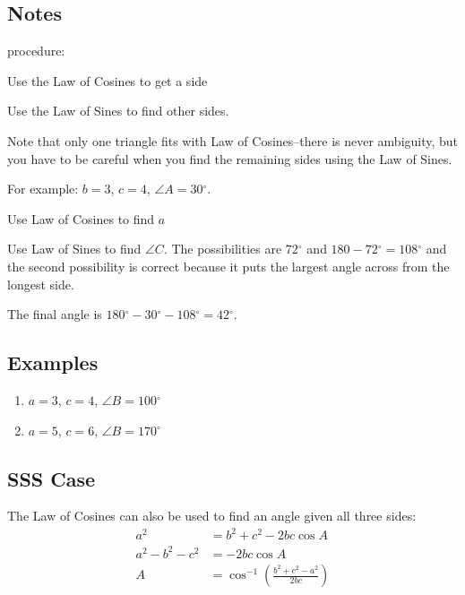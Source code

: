 \documentclass{exam}
\newcommand{\dg}{\ensuremath{^\circ}}
\begin{document}
  \subsection{Notes}

  procedure:
  \begin{itemize*}
    \item Use the Law of Cosines to get a side
    \item Use the Law of Sines to find other sides.    
  \end{itemize*}

  Note that only one triangle fits with Law of Cosines--there is never ambiguity, but you have to be careful when you
  find the remaining sides using the Law of Sines.

  For example: $b = 3$, $c = 4$, $\angle A = 30 \dg$.  
  \begin{itemize*}
    \item Use Law of Cosines to find $a$

    \item Use Law of Sines to find $\angle C$.  The possibilities are $72 \dg$ and $180 - 72 \dg = 108 \dg$ and the
      second possibility is correct because it puts the largest angle across from the longest side.

    \item The final angle is $180 \dg - 30 \dg - 108 \dg = 42 \dg$.
  \end{itemize*}

  \subsection{Examples}
  \begin{enumerate}
    \item $a = 3$, $c = 4$, $\angle B = 100 \dg$

    \item $a = 5$, $c = 6$, $\angle B = 170 \dg$

  \end{enumerate}

  \subsection{SSS Case}
  The Law of Cosines can also be used to find an angle given all three sides:
  \begin{align*}
    a^2             & = b^2 + c^2 - 2bc \cos A \\
    a^2 - b^2 - c^2 & = - 2bc \cos A \\
    A               & = \cos^{-1} \left( \frac{b^2 + c^2 - a^2}{2bc} \right) \\
  \end{align*}
\end{document}

